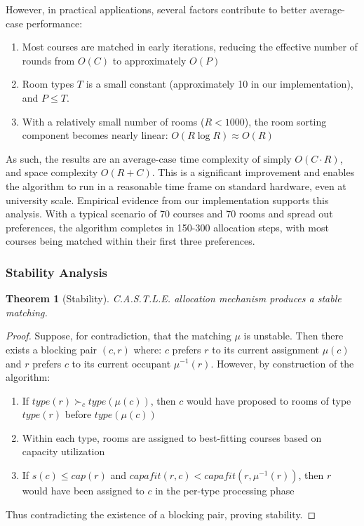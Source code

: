\documentclass[a4paper, oneside]{article}
\theoremstyle{plain}
\newtheorem{theorem}{Theorem}
\newcommand{\castle}{C{\small.}A{\small.}S{\small.}T{\small.}L{\small.}E{\small.}}
\begin{document}
However, in practical applications, several factors contribute to better average-case performance:
\begin{enumerate}
	\item Most courses are matched in early iterations, reducing the effective number of rounds from $O(C)$ to approximately $O(P)$
	\item Room types $T$ is a small constant (approximately 10 in our implementation), and $P \leq T$.
	\item With a relatively small number of rooms ($R < 1000$), the room sorting component becomes nearly linear: $O(R \log R) \approx O(R)$
\end{enumerate}

As such, the results are an $\boxed{\text{average-case time complexity of simply } O(C \cdot R)}$, and space complexity $O(R + C)$. This is a significant improvement and
enables the algorithm to run in a reasonable time frame on standard hardware, even at university scale. 
Empirical evidence from our implementation supports this analysis. With a typical scenario of 70 courses and 70 rooms and spread out preferences, the algorithm completes in 150-300 allocation steps,
with most courses being matched within their first three preferences.

\subsubsection{Stability Analysis}
\begin{theorem}[Stability]
\castle{} allocation mechanism produces a stable matching.
\end{theorem}

\begin{proof}
Suppose, for contradiction, that the matching $\mu$ is unstable. Then there exists a blocking pair $(c, r)$ where:
$c$ prefers $r$ to its current assignment $\mu(c)$ and $r$ prefers $c$ to its current occupant $\mu^{-1}(r)$.
However, by construction of the algorithm:
\begin{enumerate}
    \item If $type(r) \succ_c type(\mu(c))$, then $c$ would have proposed to rooms of type $type(r)$ before $type(\mu(c))$
    \item Within each type, rooms are assigned to best-fitting courses based on capacity utilization
    \item If $s(c) \leq cap(r)$ and $capafit(r,c) < capafit(r,\mu^{-1}(r))$, then $r$ would have been assigned to $c$ in the per-type processing phase
\end{enumerate}
Thus contradicting the existence of a blocking pair, proving stability.
\end{proof}
\end{document}
